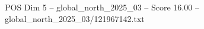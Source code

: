 \begin{textsample}{POS Dim 5 – global\_north\_2025\_03 – Score 16.00 – global\_north\_2025\_03/121967142.txt}
\end{textsample}
